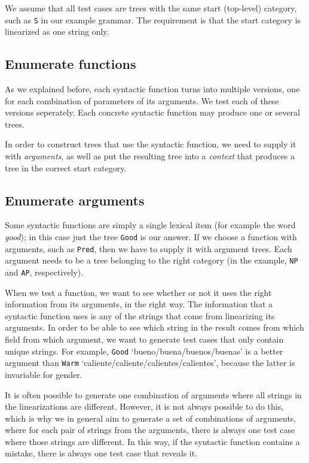 \documentclass[11pt]{article}
\def\t#1{\texttt{#1}}
\begin{document}
We assume that all test cases are trees with the same start
(top-level) category, such as \t{S} in our example grammar. The
requirement is that the start category is linearized as one string only. 

\subsection{Enumerate functions} As we explained before, each syntactic
function turns into multiple versions, one for each combination of
parameters of its arguments. We test each of these versions
seperately. Each concrete syntactic function may produce one or several trees.

In order to construct trees that use the syntactic function, we need
to supply it with \emph{arguments}, as well as put the resulting tree
into a \emph{context} that produces a tree in the correct start
category.

\subsection{Enumerate arguments} Some syntactic functions are
simply a single lexical item (for example the word \emph{good}); in
this case just the tree \t{Good} is our answer.
If we choose a function with arguments, such as \t{Pred}, then we have
to supply it with argument trees. Each argument needs to be a
tree belonging to the right category (in the example, \t{NP} and
\t{AP}, respectively). 

When we test a function, we want to see whether or not it uses the
right information from its arguments, in the right way. The
information that a syntactic function uses is any of the strings that
come from linearizing its arguments. In order to be able to see which
string in the result comes from which field from which argument, we
want to generate test cases that only contain unique strings.
For example, \t{Good} `bueno/buena/buenos/buenas' is a
better argument than \t{Warm} `caliente/caliente/calientes/calientes',
because the latter is invariable for gender.

It is often possible to generate one combination of arguments where
all strings in the linearizations are different. However, it is not
always possible to do this, which is why we in general aim to generate
a set of combinations of arguments, where for each pair of strings
from the arguments, there is always one test case where those strings
are different. In this way, if the syntactic function contains a
mistake, there is always one test case that reveals it.
\end{document}
